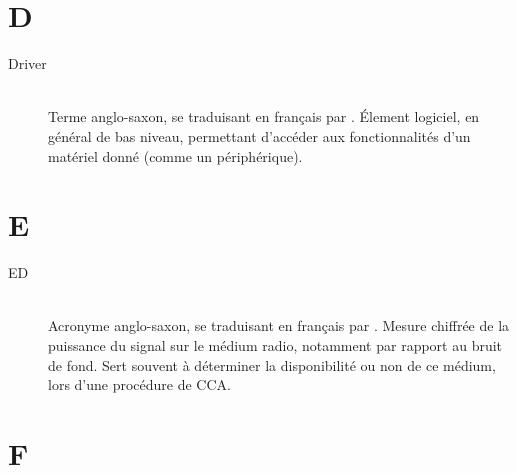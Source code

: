 
\section*{D}

\begin{description}

\item[Driver] \ \\
Terme anglo-saxon, se traduisant en français par .
\'Element logiciel, en général de bas niveau, permettant d'accéder aux
fonctionnalités d'un matériel donné (comme un périphérique).

\end{description}


\section*{E}

\begin{description}

\item[ED]  \\
Acronyme anglo-saxon, se traduisant en français par . Mesure chiffrée de la puissance du signal sur le médium
radio, notamment par rapport au bruit de fond. Sert souvent à déterminer
la disponibilité ou non de ce médium, lors d'une procédure de CCA.

\end{description}


\section*{F}

